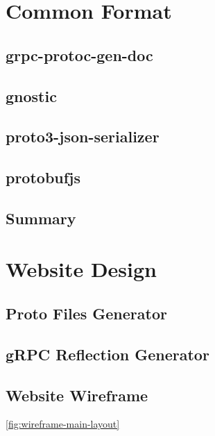 \section{Common Format}


\subsection{grpc-protoc-gen-doc}

\subsection{gnostic}

\subsection{proto3-json-serializer}

\subsection{protobufjs}

\subsection{Summary}


\section{Website Design}

\subsection{Proto Files Generator}

\subsection{gRPC Reflection Generator}

\subsection{Website Wireframe}
\ref{fig:wireframe-main-layout}

